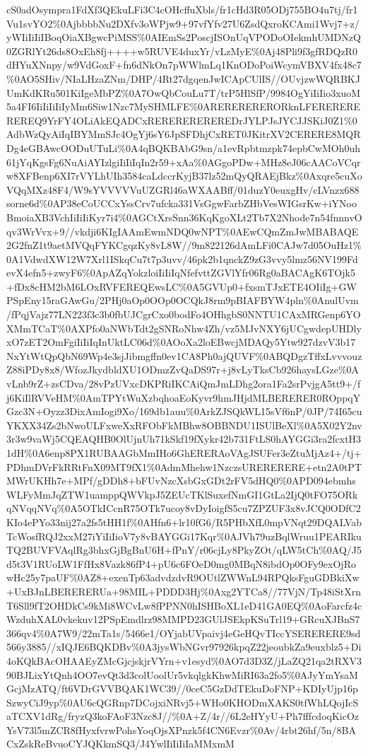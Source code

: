 \documentclass[]{article}
\begin{document}
cS0adOsympra1FdXf3QEkuLFi3C4cOHcffuXbls/fr1cHd3R05ODj755BO4u7tj/fr1Vu1svYO2\%0AjbbbbNu2DXfv3oWPjw9+97vfYfv27U6ZsdQxroKCAmi1Wvj7+z/yWIiIiIiIBoqOiaXBgwcPiMSS\%0AIEmSs2PoscjISOnUqVPODoOIekmhUMDNzQ0ZGRlYt26ds8OxEh8fj++++w5RUVE4duxYr/vLzMyE\%0Aj48Pli9f3gfRDQzR0dHYuXNnpy/w9VdGoxF+fn6dNkOn7pWWlmLq1KnODoPoiWcymVBXV4fx48c7\%0AO5SHiv/NIaLHzaZNm/DHP/4Rt27dgqenJwICApCUlIS//OUvjzwWQRBKJUmKdKRu501KiIgeMbPZ\%0A7OwQbCouLu7T/trP5HlSfP/9984OgYiIiIio3xuoM5a4FI6IiIiIiIiIyMm6Siw1Nzc7MySHMLFE\%0ARERERERERORknLFEREREREREREQ9YrFY4OLiAkEQADCxREREREREREREDrJYLPJsJYCJJSKiJ0Z1\%0AdbWzQyAiIqIBYMmSJc4OgYj6sY6JpSFDhjCxRET0JKitrXV2CERERE8MQRDg4eGBAwcOODuUTuLi\%0A4qBQKBAbG9sn/a1evRpbtmzpk74epbCwMOh0uh61jYqKgsFg6NuAiAYIzlgiIiIiIqIn2r59+xAa\%0AGgoPDw+MHz8eJ06cAACoVCqrw8XFBenp6XI7rVYLhUIh3584caLdccrKyjB37lz52mQyQRAEjBkz\%0Axqre5cuXoVQqMXz48F4/W9sYVVVVVuUZGRl46aWXAABff/01duzY0euxgHv/cLVnzx688sorne6d\%0AP38eCoUCCxYssCrv7ufcka331VsGgwFarbZHbVesWIGsrKw+iYNooBmoiaXB3VchIiIiIiKyr7i4\%0AGCtXrsSnn36KqKgoXLt2Tb7X2Nhode7n54fnnnvOqv3WrVvx+9//vkdji6KIgIAAmEwmNDQ0wNPT\%0AEwCQmZmJwMBABAQE2G2fnZ1t9aetMVQqFYKCgqzKy8vL8W//9m822126dAmLFi0CAJw7d05OuHz1\%0A1VdwdXW12W7Xrl1ISkqCu7t7p3uvv/46pk2b1qnckZ9zG3vvy5lmz56NV199FdevX4efn5+zwyF6\%0ApAZqYokzloiIiIiIqNfefvttZGVlYfr06Rg0aBACAgK6TOjk5+fDx8cHM2bM6LOxRVFEREQEwsLC\%0A5GVUp0+fxsmTJxETE4OIiIg+GWPSpEny15raGAwGu/2PHj0aOp0OOp0OCQkJ8rm9pBIAFBYW4pln\%0AnulUvm/fPqjVajz77LN223f3c3b0fbUJCgrCxo0bodFo4OHhgbS0NNTU1CAxMRGenp6YOXMmTCaT\%0AXPfo0aNWbTdt2gSNRoNhw4Zh/vz5MJvNXY6jUCgwdepUHDlyxO7zET2OmFgiIiIiIqInUktLC06d\%0AOoXa2loEBwcjMDAQy5Ytw927dzvV3b17NxYtWtQpQbN69Wp4e3sjJibmgffn0ev1CA8Ph0ajQUVF\%0ABQDgzTffxLvvvouzZ88iPDy8x8/WfozJkydbldXU1ODmzZvQaDS97r+j8vLyTksCb926haysLGze\%0AvLnb9rZ+zsCDva/28vPzUVxcDKPRiIKCAiQmJmLDhg2ora1Fa2srPvjgA5tt9+/fj6KiIlRVVeHM\%0AmTPYtWuXzbqhoaEoKyvr9hmJHjdMLBERERER0ROppqYGzc3N+Oyzz3DixAmIogi9Xo/169db1auu\%0ArkZJSQkWL15sVf6nP/0JP/74I65cuYKXX34Zs2bNwoULFxweXxRFObFkMBhw8OBBNDU1ISUlBeXl\%0A5X02Y2nv3r3w9vaWj5CQEAQHB0OlUjnUh71kSkf19fXykr42b731FtLS0hAYGGi3ra2fcxtH31dH\%0A6enp8PX1RUBAAGbMmIHo6GhERERAoVAgJSUFer3eZtuMjAz4+/tj+PDhmDVrFkRRtFnX09MT9fX1\%0AdmMhehw1NzczsURERERERE+etn2A0tPTMWrUKHh7e+MPf/gDDh8+bFUvNzcXsbGxGDt2rFV5dHQ0\%0APD094ebmhsWLFyMmJqZTW1uamppQWVkpJ5ZEUcTKlSuxefNmGI1GtLa2IjQ0tFO75ORkqNVqqNVq\%0A5OTkICcnR75OTk7ucoy8vDyIoigfS5cu7ZPZUF3x8vJCQ0ODfC2KIo4ePYo33nij27a2fs5tHH1f\%0AHfn6+lr10fG6/R5PHbXfL0mpVNqt29DQALVabTcWosfRQJ2xxM27iYiIiIioV7y8vBAYGGi17Kqr\%0AJVh79uzBqlWruu1PEARIkuTQ2BUVFVAqlRg3bhxGjBgBnU6H+fPnY/r06cjLy8PkyZOt/qLW5tCh\%0AQ/J5d5t3V1RUoLW1FfHx8Vazk86fP4+pU6c6FOeD0mg0MBqN8ibdOp0OFy9exOjRowHc25y7paUF\%0AZ8+exenTp63advdzdvR9OUtlZWWnL94RPQksFguGDBkiXw+UxBJnLBERERERUa+98MIL+PDDD3Hj\%0Axg2YTCa8//77VjN/Tp48iStXrnT6Sll9fT2OHDkCs9kMi8WCvLw8fPPNN0hISHBoXL1eD41GA0EQ\%0AoFarcfz4cWzduhXAL0vkekuv12PSpEmdlrz98MMPD23GUlJSEkpKSuTrl19+GRcuXJBnS7366qv4\%0A7W9/22mTa1s/5466e1/OYjabUVpaivj4eGeHQvTIccYSERERERE9sd566y3885//xIQJE6BQKDBv\%0A3jysWbNGvr97926kpqZ22jeoubkZa9euxblz5+Di4oKQkBAcOHAAEyZMcGjcjskjrVYrn+v1esyd\%0AO7d3D3Z/jLaZQ21qa2tRXV390BJLixYtQnh4OO7evQt3d3colUoolUr5vkqlgkKhwMiRI63a2fo5\%0AJyYmYsaMGcjMzATQ/ft6VDrGVVBQAK1WC39//0ceC5GzDdTEkuDoFNP+KDIyUjp16pSzwyCiJ9yp\%0AU6cQGRnp7DCojxiNRvj5+WHo0KHODmXAKS0tfWhLQojIcSaTCXV1dRg/fryzQ3koFAoF3Nzc8J//\%0A+Z/4r//6L2eHYyU+Ph7fffcdoqKicOzYsV73l5mZCR8fHyxfvrwPohsYoqOjsXPnzk5f4CN6Evzr\%0Av/4rbt26hf/5n/8BACxZskReBvuoCYJQKkmSQ3/J4YwlIiIiIiIaMMxmM
\end{document}
